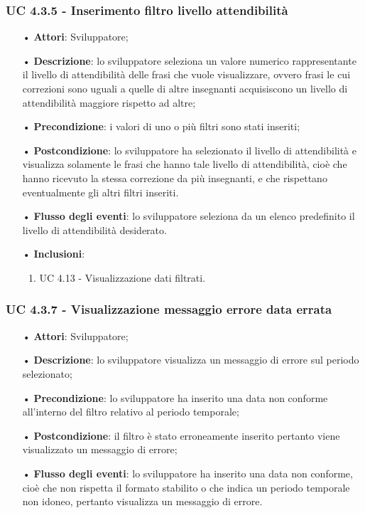\subsubsection{UC 4.3.5 - Inserimento filtro livello attendibilità}
\begin{itemize}
	\item[•]\textbf{Attori}: Sviluppatore;
	\item[•]\textbf{Descrizione}: lo sviluppatore seleziona un valore numerico rappresentante il livello di attendibilità delle frasi che vuole visualizzare, ovvero frasi le cui correzioni sono uguali a quelle di altre insegnanti acquisiscono un livello di attendibilità maggiore rispetto ad altre;
	\item[•]\textbf{Precondizione}: i valori di uno o più filtri sono stati inseriti;
	\item[•]\textbf{Postcondizione}: lo sviluppatore ha selezionato il livello di attendibilità e visualizza solamente le frasi che hanno tale livello di attendibilità, cioè che hanno ricevuto la stessa correzione da più insegnanti, e che rispettano eventualmente gli altri filtri inseriti.
	\item[•]\textbf{Flusso degli eventi}: lo sviluppatore seleziona da un elenco predefinito il livello di attendibilità desiderato.
	\item[•]\textbf{Inclusioni}:
	\begin{enumerate}
		\item UC 4.13 - Visualizzazione dati filtrati.
	\end{enumerate}
\end{itemize}



\subsubsection{UC 4.3.7 - Visualizzazione messaggio errore data errata}
\begin{itemize}
	\item[•]\textbf{Attori}: Sviluppatore;
	\item[•]\textbf{Descrizione}: lo sviluppatore visualizza un messaggio di errore sul periodo selezionato;
	\item[•]\textbf{Precondizione}: lo sviluppatore ha inserito una data non conforme all'interno del filtro relativo al periodo temporale;
	\item[•]\textbf{Postcondizione}: il filtro è stato erroneamente inserito pertanto viene visualizzato un messaggio di errore;
	\item[•]\textbf{Flusso degli eventi}: lo sviluppatore ha inserito una data non conforme, cioè che non rispetta il formato stabilito o che indica un periodo temporale non idoneo, pertanto visualizza un messaggio di errore.
\end{itemize}

